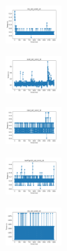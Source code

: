 \vspace*{\fill}
\newpage
\vspace*{\fill}

\begin{figure}[H]    
    \centering
    \begin{subfigure}
        \centering
        \includegraphics[width=0.234\textwidth]{img/aggsf/iris_set_const_10_949004259_time.png}
    \end{subfigure}
    \hfill
    \begin{subfigure}
        \centering
        \includegraphics[width=0.234\textwidth]{img/aggsf/ecoli_set_const_10_949004259_time.png}
    \end{subfigure}
    \hfill
    \begin{subfigure}
        \centering
        \includegraphics[width=0.234\textwidth]{img/aggsf/rand_set_const_10_949004259_time.png}
    \end{subfigure}
    \hfill
    \begin{subfigure}
        \centering
        \includegraphics[width=0.234\textwidth]{img/aggsf/newthyroid_set_const_10_949004259_time.png}
    \end{subfigure}
    \hfill
    \begin{subfigure}
        \centering
        \includegraphics[width=0.234\textwidth]{img/aggsf/iris_set_const_10_589741062_time.png}

\end{subfigure}
\end{figure}
